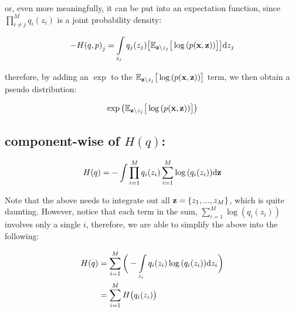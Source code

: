 \documentclass{article}
\begin{document}
or, even more meaningfully, it can be put into an expectation function, since $\prod_{ i \neq j}^M q_i(z_i)$ is a joint probability density:

\begin{equation}\begin{split}
 {- H(q,p)}_{j} = \int\limits_{z_j} q_j(z_j) \big[  \mathbb{E}_{{\mathbf z} \setminus z_j} \big[ \log{(p({\mathbf x},{\mathbf z}))} \big]   \big]  \text{d} z_j
 \end{split}\end{equation}

%
%

therefore, by adding an $\exp$ to the $\mathbb{E}_{{\mathbf z} \setminus z_j} \big[ \log{(p({\mathbf x},{\mathbf z}))} \big] $ term, we then obtain a pseudo distribution:

\begin{equation}\begin{split}
\exp \big( \mathbb{E}_{{\mathbf z} \setminus z_j} \big[ \log{(p({\mathbf x},{\mathbf z}))} \big] \big)
 \end{split}\end{equation}


\subsection{component-wise of $H(q)$:}

\begin{equation}\begin{split}
H(q) = - \int \prod_{i=1}^M q_i(z_i)\sum_{i=1}^M \log { (q_i(z_i))}\text{d} {\mathbf z}
\end{split}\end{equation}

Note that the above needs to integrate out all ${\mathbf z} = \{z_1, ..., z_M \}$, which is quite daunting. However, notice that each term in the sum, $\sum_{i=1}^M \log { (q_i(z_i))}$ involves only a single $i$, therefore, we are able to simplify the above into the following:

\begin{equation}\begin{split}
H(q) &= \sum_{i=1}^M \bigg(- \int\limits_{z_i} q_i(z_i)  \log { (q_i(z_i))} \text{d} z_i \bigg)\\
&= \sum_{i=1}^M H \big(q_i(z_i) \big)\\
\end{split}\end{equation}
\end{document}
